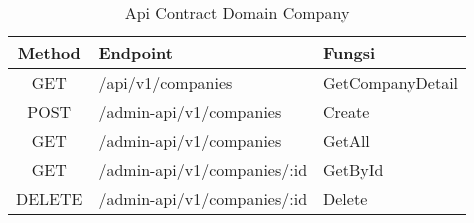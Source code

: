 \bgroup
\begin{table}[htbp]
    \caption{Api Contract Domain Company}
    \label{tab:api-contract-domain-company}
    \def\arraystretch{1.7}
    \centering
    \begin{tabular}{|c|p{6cm}|p{4cm}|}
        \hline
        Method & Endpoint                    &
        Fungsi                                                  \\
        \hline
        GET    & /api/v1/companies           & GetCompanyDetail \\
        \hline
        POST   & /admin-api/v1/companies     & Create           \\
        \hline
        GET    & /admin-api/v1/companies     & GetAll           \\
        \hline
        GET    & /admin-api/v1/companies/:id & GetById          \\
        \hline
        DELETE & /admin-api/v1/companies/:id & Delete           \\
        \hline
    \end{tabular}
\end{table}
\egroup

